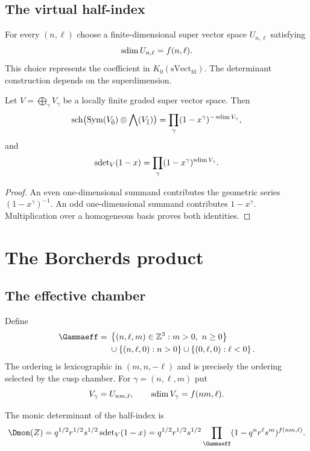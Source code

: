 \section{The virtual half-index}
For every $(n,\ell)$ choose a finite-dimensional super vector space $U_{n,\ell}$ satisfying
\[
 \operatorname{sdim} U_{n,\ell}=f(n,\ell).
\]
This choice represents the coefficient in $K_0(\mathrm{sVect}_{\mathrm{fd}})$. The determinant construction depends on the superdimension.

\begin{lemma}
Let $V=\bigoplus_{\gamma}V_\gamma$ be a locally finite graded super vector space. Then
\[
 \operatorname{sch}\bigl(\operatorname{Sym}(V_{\bar0})\otimes\bigwedge(V_{\bar1})\bigr)
 =\prod_\gamma(1-x^\gamma)^{-\operatorname{sdim} V_\gamma},
\]
and
\[
 \operatorname{sdet}_V(1-x)=\prod_\gamma(1-x^\gamma)^{\operatorname{sdim} V_\gamma}.
\]
\end{lemma}
\begin{proof}
An even one-dimensional summand contributes the geometric series $(1-x^\gamma)^{-1}$. An odd one-dimensional summand contributes $1-x^\gamma$. Multiplication over a homogeneous basis proves both identities.
\end{proof}

\chapter{The Borcherds product}
\section{The effective chamber}
Define
\[
\begin{aligned}
\Gammaeff={}&\set{(n,\ell,m)\in\Z^3:m>0,\ n\ge0}\\
&\cup\set{(n,\ell,0):n>0}
 \cup\set{(0,\ell,0):\ell<0}.
\end{aligned}
\]
The ordering is lexicographic in $(m,n,-\ell)$ and is precisely the ordering selected by the cusp chamber.
For $\gamma=(n,\ell,m)$ put
\[
 V_\gamma=U_{nm,\ell},
 \qquad \operatorname{sdim} V_\gamma=f(nm,\ell).
\]

\begin{definition}
The monic determinant of the half-index is
\[
 \Dmon(Z)=q^{1/2}r^{1/2}s^{1/2}
 \sdet_V(1-x)
 =q^{1/2}r^{1/2}s^{1/2}
 \prod_{\Gammaeff}(1-q^nr^\ell s^m)^{f(nm,\ell)}.
\]
\end{definition}

